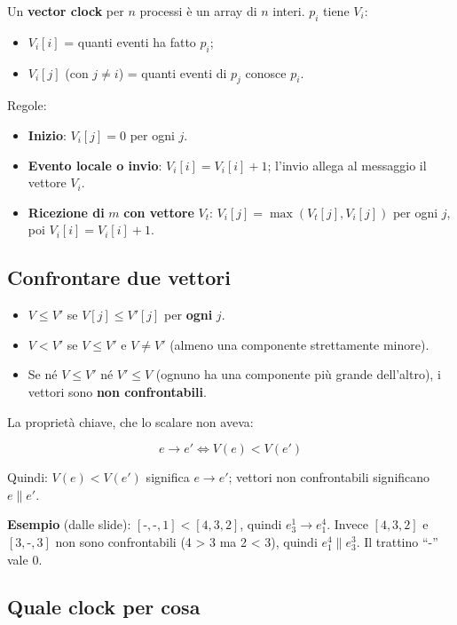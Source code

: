 Un \textbf{vector clock} per \(n\) processi è un array di \(n\) interi. \(p_i\) tiene \(V_i\):

\begin{itemize}
\tightlist
\item
  \(V_i[i]\) = quanti eventi ha fatto \(p_i\);
\item
  \(V_i[j]\) (con \(j \neq i\)) = quanti eventi di \(p_j\) conosce \(p_i\).
\end{itemize}

Regole:

\begin{itemize}
\tightlist
\item
  \textbf{Inizio}: \(V_i[j] = 0\) per ogni \(j\).
\item
  \textbf{Evento locale o invio}: \(V_i[i] = V_i[i] + 1\); l'invio allega al messaggio il vettore \(V_i\).
\item
  \textbf{Ricezione di} \(m\) \textbf{con vettore} \(V_t\): \(V_i[j] = \max(V_t[j], V_i[j])\) per ogni \(j\), poi \(V_i[i] = V_i[i] + 1\).
\end{itemize}

\subsection{Confrontare due vettori}

\begin{itemize}
\tightlist
\item
  \(V \le V'\) se \(V[j] \le V'[j]\) per \textbf{ogni} \(j\).
\item
  \(V < V'\) se \(V \le V'\) e \(V \neq V'\) (almeno una componente strettamente minore).
\item
  Se né \(V \le V'\) né \(V' \le V\) (ognuno ha una componente più grande dell'altro), i vettori sono \textbf{non confrontabili}.
\end{itemize}

La proprietà chiave, che lo scalare non aveva:

\[
e \to e' \iff V(e) < V(e')
\]

Quindi: \(V(e) < V(e')\) significa \(e \to e'\); vettori non confrontabili significano \(e \parallel e'\).

\textbf{Esempio} (dalle slide): \([\text{-},\text{-},1] < [4,3,2]\), quindi \(e^1_3 \to e^4_1\). Invece \([4,3,2]\) e \([3,\text{-},3]\) non sono confrontabili (4 \textgreater{} 3 ma 2 \textless{} 3), quindi \(e^4_1 \parallel e^3_3\). Il trattino ``-'' vale 0.

\subsection{Quale clock per cosa}

